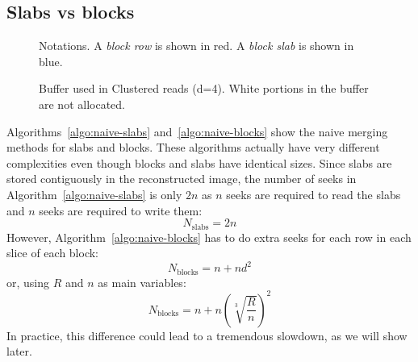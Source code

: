 \documentclass[10pt, conference, compsocconf]{IEEEtran}
\begin{document}
\subsection{Slabs vs blocks}

\begin{figure}
  \centering
  \begin{minipage}[b]{0.42\columnwidth}
    \def\svgwidth{0.8\columnwidth}
    
    \caption{Notations. A \emph{block row} is shown in red. A
      \emph{block slab} is shown in blue.}
    \label{fig:notations}
  \end{minipage}
  \quad \quad \quad
  \begin{minipage}[b]{0.42\columnwidth}
    \def\svgwidth{0.8\columnwidth}
    
    \caption{Buffer used in Clustered reads (d=4).  White portions in
      the buffer are not allocated. }
    \label{fig:cluster-reads-buffer}
  \end{minipage}
\end{figure}
Algorithms~\ref{algo:naive-slabs} and~\ref{algo:naive-blocks} show
the naive merging methods for slabs and blocks. These algorithms
actually have very different complexities even though blocks and
slabs have identical sizes. Since slabs are stored contiguously in
the reconstructed image, the number of seeks in
Algorithm~\ref{algo:naive-slabs} is only $2n$ as $n$ seeks are
required to read the slabs and $n$ seeks are required to write them:
\begin{equation}
  N_\mathrm{slabs} = 2n \label{eq:naive-blocks}
\end{equation}
However,
Algorithm~\ref{algo:naive-blocks} has to do extra seeks for each row
in each slice of each block:
\begin{equation*}
N_\mathrm{blocks} = n+nd^2  
\end{equation*}
or, using $R$ and $n$ as main variables:
\begin{equation}
N_\mathrm{blocks} = n+n\left(\sqrt[3]{\frac{R}{n}}\right)^2 \label{eq:naive-slabs}
\end{equation}
In practice, this difference could lead to a tremendous slowdown, as
we will show later.
\end{document}
